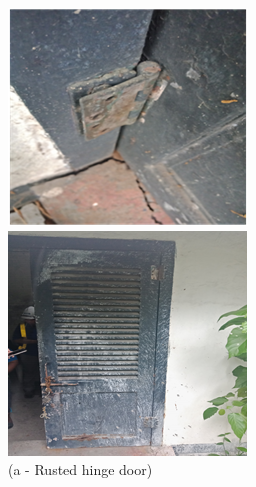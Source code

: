 \begin{figure}[!h]
	
	\begin{minipage}[b]{0.22\linewidth}
		\centering
		\includegraphics[width=\textwidth]{figures/fig_ch04_fdas_rustedhingerdoor}
		\caption*{(a - Rusted hinge door)}
	\end{minipage}
	\hspace{0.03cm}
	\begin{minipage}[b]{0.22\linewidth}
		\centering
		\includegraphics[width=\textwidth]{figures/fig_ch04_fdas_brokendoor}

\end{minipage}
\end{figure}
